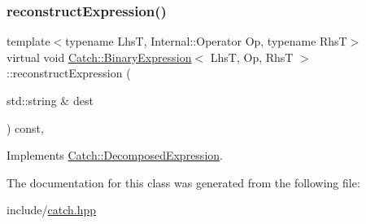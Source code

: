 \mbox{\label{class_catch_1_1_binary_expression_a6ed73ff9af9c229f9fa3d35d019f9e37}} 
\subsubsection{\texorpdfstring{reconstruct\+Expression()}{reconstructExpression()}}
{\footnotesize\ttfamily template$<$typename LhsT, Internal\+::\+Operator Op, typename RhsT$>$ \\
virtual void \mbox{\hyperlink{class_catch_1_1_binary_expression}{Catch\+::\+Binary\+Expression}}$<$ LhsT, Op, RhsT $>$\+::reconstruct\+Expression (\begin{DoxyParamCaption}\item[{std\+::string \&}]{dest }\end{DoxyParamCaption}) const\hspace{0.3cm}{\ttfamily [inline]}, {\ttfamily [virtual]}}



Implements \mbox{\hyperlink{struct_catch_1_1_decomposed_expression_a9ce7f356dc96f11f80e40c82f5aa7e55}{Catch\+::\+Decomposed\+Expression}}.



The documentation for this class was generated from the following file\+:\begin{DoxyCompactItemize}
\item 
include/\mbox{\hyperlink{catch_8hpp}{catch.\+hpp}}\end{DoxyCompactItemize}
